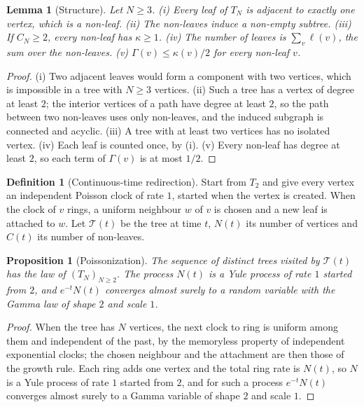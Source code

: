\documentclass[11pt]{article}
\theoremstyle{plain}
\newtheorem{lemma}[theorem]{Lemma}
\newtheorem{proposition}[theorem]{Proposition}
\theoremstyle{definition}
\newtheorem{definition}[theorem]{Definition}
\theoremstyle{remark}
\begin{document}
\begin{lemma}[Structure]\label{lem:structure}
Let $N\ge3$. (i) Every leaf of $T_N$ is adjacent to exactly one vertex, which is a non-leaf. (ii) The non-leaves induce a non-empty subtree. (iii) If $C_N\ge2$, every non-leaf has $\kappa\ge1$. (iv) The number of leaves is $\sum_v\ell(v)$, the sum over the non-leaves. (v) $\Gamma(v)\le\kappa(v)/2$ for every non-leaf $v$.
\end{lemma}

\begin{proof}
(i) Two adjacent leaves would form a component with two vertices, which is impossible in a tree with $N\ge3$ vertices. (ii) Such a tree has a vertex of degree at least $2$; the interior vertices of a path have degree at least $2$, so the path between two non-leaves uses only non-leaves, and the induced subgraph is connected and acyclic. (iii) A tree with at least two vertices has no isolated vertex. (iv) Each leaf is counted once, by (i). (v) Every non-leaf has degree at least $2$, so each term of $\Gamma(v)$ is at most $1/2$.
\end{proof}

\begin{definition}[Continuous-time redirection]
Start from $T_2$ and give every vertex an independent Poisson clock of rate $1$, started when the vertex is created. When the clock of $v$ rings, a uniform neighbour $w$ of $v$ is chosen and a new leaf is attached to $w$. Let $\mathcal T(t)$ be the tree at time $t$, $N(t)$ its number of vertices and $C(t)$ its number of non-leaves.
\end{definition}

\begin{proposition}[Poissonization]\label{prop:poisson}
The sequence of distinct trees visited by $\mathcal T(t)$ has the law of $(T_N)_{N\ge2}$. The process $N(t)$ is a Yule process of rate $1$ started from $2$, and $e^{-t}N(t)$ converges almost surely to a random variable with the Gamma law of shape $2$ and scale $1$.
\end{proposition}

\begin{proof}
When the tree has $N$ vertices, the next clock to ring is uniform among them and independent of the past, by the memoryless property of independent exponential clocks; the chosen neighbour and the attachment are then those of the growth rule. Each ring adds one vertex and the total ring rate is $N(t)$, so $N$ is a Yule process of rate $1$ started from $2$, and for such a process $e^{-t}N(t)$ converges almost surely to a Gamma variable of shape $2$ and scale $1$.
\end{proof}
\end{document}
